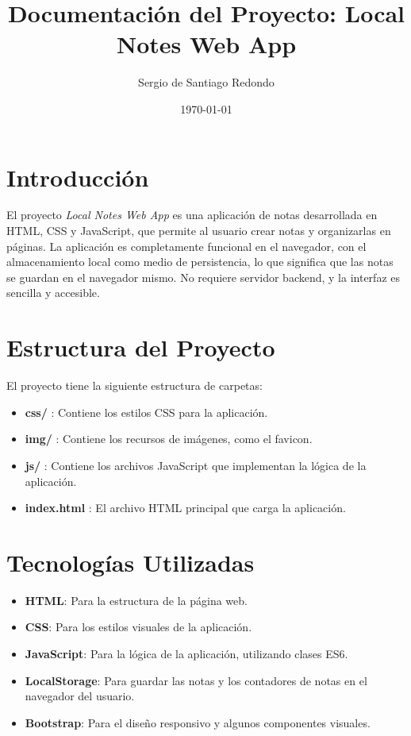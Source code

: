 \documentclass[a4paper,12pt]{report}
\title{Documentación del Proyecto: Local Notes Web App}
\author{Sergio de Santiago Redondo}
\date{\today}
\begin{document}
\maketitle
\tableofcontents

\chapter{Introducción}

El proyecto \textit{Local Notes Web App} es una aplicación de notas desarrollada en HTML, CSS y JavaScript, que permite al usuario crear notas y organizarlas en páginas. La aplicación es completamente funcional en el navegador, con el almacenamiento local como medio de persistencia, lo que significa que las notas se guardan en el navegador mismo. No requiere servidor backend, y la interfaz es sencilla y accesible.

\chapter{Estructura del Proyecto}

El proyecto tiene la siguiente estructura de carpetas:

\begin{itemize}
	\item \textbf{css/} : Contiene los estilos CSS para la aplicación.
	\item \textbf{img/} : Contiene los recursos de imágenes, como el favicon.
	\item \textbf{js/} : Contiene los archivos JavaScript que implementan la lógica de la aplicación.
	\item \textbf{index.html} : El archivo HTML principal que carga la aplicación.
\end{itemize}

\chapter{Tecnologías Utilizadas}

\begin{itemize}
	\item \textbf{HTML}: Para la estructura de la página web.
	\item \textbf{CSS}: Para los estilos visuales de la aplicación.
	\item \textbf{JavaScript}: Para la lógica de la aplicación, utilizando clases ES6.
	\item \textbf{LocalStorage}: Para guardar las notas y los contadores de notas en el navegador del usuario.
	\item \textbf{Bootstrap}: Para el diseño responsivo y algunos componentes visuales.
\end{itemize}
\end{document}
